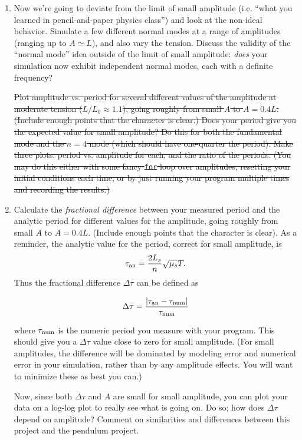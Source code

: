 \documentclass[12pt]{article}
\begin{document}
\begin{enumerate}
{\it Note: This part may be modified in the next few weeks.}

\item{Now we're going to deviate from the limit of small amplitude (i.e. ``what you learned in pencil-and-paper physics class'') and look at the non-ideal behavior. Simulate a few different normal modes at a range of amplitudes (ranging up to $A \simeq L$), and also vary the tension.
Discuss the validity of the ``normal mode'' idea outside of the limit of small amplitude: {\it does} your simulation now exhibit independent normal modes, each with a definite frequency?}



\st{Plot amplitude vs. period for several different values of the amplitude at moderate tension ($L/L_0 \approx 1.1$), going roughly from small $A$ to $A=0.4L$. (Include enough points that the character is clear.) Does your period give you the expected value for small amplitude?
Do this for both the fundamental mode and the $n=4$ mode (which should have one-quarter the period). Make three plots: period vs. 
amplitude for each, and the ratio of the periods. (You may do this either with some fancy {\tt for} loop over amplitudes, resetting your initial conditions each time, or by just running your program multiple times and recording the results.)}

\item{Calculate the {\it fractional difference} between your measured period and the analytic period for different values for the amplitude, going roughly from small $A$ to $A=0.4L$. (Include enough points that the character is clear). As a reminder, the analytic value
for the period, correct for small amplitude, is $$\tau_{\rm {an}}=\frac{2L_s}{n} \sqrt{\mu_s}{T}.$$ Thus the fractional difference $\Delta \tau$ can be defined as

$$\Delta \tau = \frac{\left |\tau_{\rm an} - \tau_{\rm num}\right|}{\tau_{\rm num}}$$

where $\tau_{\rm num}$ is the numeric period you measure with your program. This should give you a $\Delta \tau$ value close to zero for small amplitude. (For small amplitudes, the difference will be dominated by modeling error and numerical error in your 
simulation, rather than by any amplitude effects. You will want to minimize these as best you can.) 

Now, since both $\Delta \tau$ and $A$ are small for small amplitude, you can plot your data on a log-log plot to really see what is going on. Do so; how does $\Delta \tau$ depend on amplitude? 
Comment on similarities and differences between this project and the pendulum project.

}
\end{enumerate}
\end{document}
